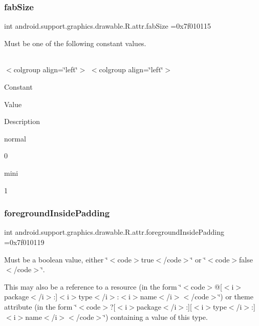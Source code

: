 \subsubsection{\texorpdfstring{fab\+Size}{fabSize}}
{\footnotesize\ttfamily int android.\+support.\+graphics.\+drawable.\+R.\+attr.\+fab\+Size =0x7f010115\hspace{0.3cm}{\ttfamily [static]}}

Must be one of the following constant values.

\tabulinesep=1mm
\begin{longtabu} spread 0pt [c]{*{0}{|X[-1]}|}
\hline
\end{longtabu}
$<$colgroup align=\char`\"{}left\char`\"{}$>$ $<$colgroup align=\char`\"{}left\char`\"{}$>$ 

Constant

Value

Description 

{\ttfamily normal}

0

{\ttfamily mini}

1\mbox{\label{classandroid_1_1support_1_1graphics_1_1drawable_1_1R_1_1attr_af2e2ee2b9e4c25e41bdc010f634b5196}} 
\subsubsection{\texorpdfstring{foreground\+Inside\+Padding}{foregroundInsidePadding}}
{\footnotesize\ttfamily int android.\+support.\+graphics.\+drawable.\+R.\+attr.\+foreground\+Inside\+Padding =0x7f010119\hspace{0.3cm}{\ttfamily [static]}}

Must be a boolean value, either \char`\"{}$<$code$>$true$<$/code$>$\char`\"{} or \char`\"{}$<$code$>$false$<$/code$>$\char`\"{}. 

This may also be a reference to a resource (in the form \char`\"{}$<$code$>$@\mbox{[}$<$i$>$package$<$/i$>$\+:\mbox{]}$<$i$>$type$<$/i$>$\+:$<$i$>$name$<$/i$>$$<$/code$>$\char`\"{}) or theme attribute (in the form \char`\"{}$<$code$>$?\mbox{[}$<$i$>$package$<$/i$>$\+:\mbox{]}\mbox{[}$<$i$>$type$<$/i$>$\+:\mbox{]}$<$i$>$name$<$/i$>$$<$/code$>$\char`\"{}) containing a value of this type. \mbox{\label{classandroid_1_1support_1_1graphics_1_1drawable_1_1R_1_1attr_aea16c56befc9fdf7b650752777d63e89}} 
